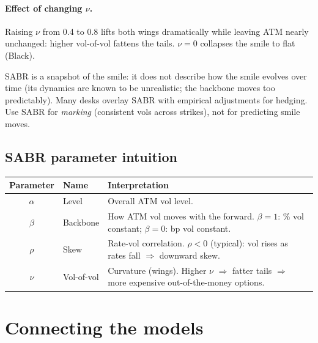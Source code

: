 \paragraph{Effect of changing $\nu$.}
Raising $\nu$ from 0.4 to 0.8 lifts both wings dramatically while
leaving ATM nearly unchanged: higher vol-of-vol fattens the tails.
$\nu = 0$ collapses the smile to flat (Black).

\begin{pitfallbox}
SABR is a snapshot of the smile: it does not describe how the
smile evolves over time (its dynamics are known to be unrealistic;
the backbone moves too predictably).  Many desks overlay SABR with
empirical adjustments for hedging.  Use SABR for \emph{marking}
(consistent vols across strikes), not for predicting smile moves.
\end{pitfallbox}

\subsection{SABR parameter intuition}

\begin{keyfactbox}
\begin{center}
\begin{tabular}{clp{}}
  \toprule
  Parameter & Name & Interpretation \\
  \midrule
  $\alpha$ & Level & Overall ATM vol level. \\
  $\beta$ & Backbone &
    How ATM vol moves with the forward.  $\beta=1$: \% vol constant;
    $\beta=0$: bp vol constant. \\
  $\rho$ & Skew &
    Rate-vol correlation.  $\rho<0$ (typical): vol rises as rates fall
    $\Rightarrow$ downward skew. \\
  $\nu$ & Vol-of-vol &
    Curvature (wings).  Higher $\nu$ $\Rightarrow$ fatter
    tails $\Rightarrow$ more expensive out-of-the-money options. \\
  \bottomrule
\end{tabular}
\end{center}
\end{keyfactbox}


\section{Connecting the models}
\label{sec:models_comparison}

